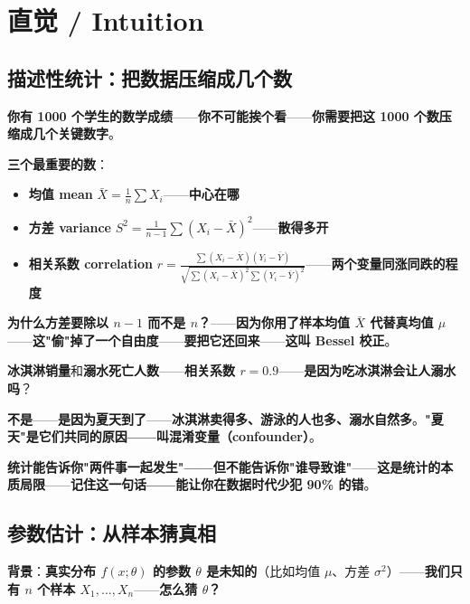 \section{直觉 / Intuition}

\subsection{描述性统计：把数据压缩成几个数}

\textbf{你有 1000 个学生的数学成绩}——\textbf{你不可能挨个看}——\textbf{你需要把这 1000 个数压缩成几个关键数字}。

\textbf{三个最重要的数}：

\begin{itemize}
\item \textbf{均值 mean} $\bar{X} = \frac{1}{n}\sum X_i$——\textbf{中心在哪}
\item \textbf{方差 variance} $S^2 = \frac{1}{n-1}\sum(X_i - \bar{X})^2$——\textbf{散得多开}
\item \textbf{相关系数 correlation} $r = \frac{\sum(X_i-\bar{X})(Y_i-\bar{Y})}{\sqrt{\sum(X_i-\bar{X})^2 \sum(Y_i-\bar{Y})^2}}$——\textbf{两个变量同涨同跌的程度}
\end{itemize}

\textbf{为什么方差要除以 $n-1$ 而不是 $n$？}——\textbf{因为你用了样本均值 $\bar{X}$ 代替真均值 $\mu$}——\textbf{这"偷"掉了一个自由度}——\textbf{要把它还回来}——\textbf{这叫 Bessel 校正}。

\begin{example}[相关 $\neq$ 因果]
\textbf{冰淇淋销量}和\textbf{溺水死亡人数}——\textbf{相关系数 $r = 0.9$}——\textbf{是因为吃冰淇淋会让人溺水吗}？

\textbf{不是}——\textbf{是因为夏天到了}——\textbf{冰淇淋卖得多、游泳的人也多、溺水自然多}。\textbf{"夏天"是它们共同的原因——叫混淆变量（confounder）}。

\textbf{统计能告诉你"两件事一起发生"——但不能告诉你"谁导致谁"}——\textbf{这是统计的本质局限}——\textbf{记住这一句话——能让你在数据时代少犯 90\% 的错}。
\end{example}

\subsection{参数估计：从样本猜真相}

\textbf{背景}：\textbf{真实分布 $f(x; \theta)$ 的参数 $\theta$ 是未知的}（比如均值 $\mu$、方差 $\sigma^2$）——\textbf{我们只有 $n$ 个样本 $X_1, \ldots, X_n$}——\textbf{怎么猜 $\theta$？}

